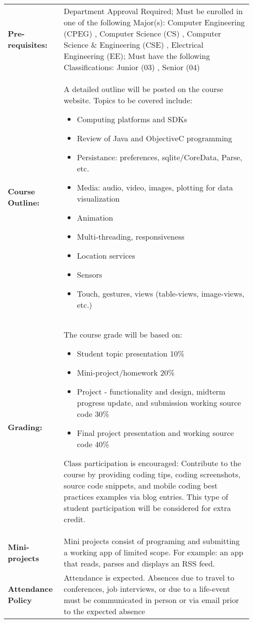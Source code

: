 \begin{center}
\begin{longtable}{ p{} p{} }
\textbf{Pre-requisites:} & Department Approval Required; 
Must be enrolled in one of the following Major(s):
Computer Engineering (CPEG) ,  Computer Science (CS) ,  Computer Science \& Engineering (CSE) ,  Electrical Engineering (EE); Must have the following Classifications: Junior (03) ,  Senior (04) \\
\textbf{Course Outline:} & A detailed outline will be posted on the course website. Topics to be covered include:
  \begin{itemize} 
  \item Computing platforms and SDKs
  \item Review of Java and ObjectiveC programming
  \item Persistance: preferences, sqlite/CoreData, Parse, etc.
  \item Media: audio, video, images, plotting for data visualization
  \item Animation
  \item Multi-threading, responsiveness
  \item Location services
  \item Sensors 
  \item Touch, gestures, views (table-views, image-views, etc.)
  \end{itemize} \\

\textbf{Grading:} & The course grade will be based on: 
	\begin{itemize}
	\item Student topic presentation 10\%
	\item Mini-project/homework 20\%
	\item Project - functionality and design, midterm progress update, and 
	submission working source code 30\%
	\item Final project presentation and working source code 40\% 
	\end{itemize} 
	Class participation is encouraged: Contribute to the course by 
	providing coding tips, 	coding screenshots, source code snippets, and 
	mobile coding best practices examples via blog entries.  This type of 
	student participation will be considered for extra credit.\\
\textbf{Mini-projects} & Mini projects consist of programing and submitting
a working app of limited scope.  For example: an app that reads, parses and displays
an RSS feed. \\
\textbf{Attendance Policy }& Attendance is expected. Absences due to travel to conferences, job interviews, or due to a life-event must be 
communicated in person or via email prior to the expected absence\\


\end{longtable}
\end{center}
